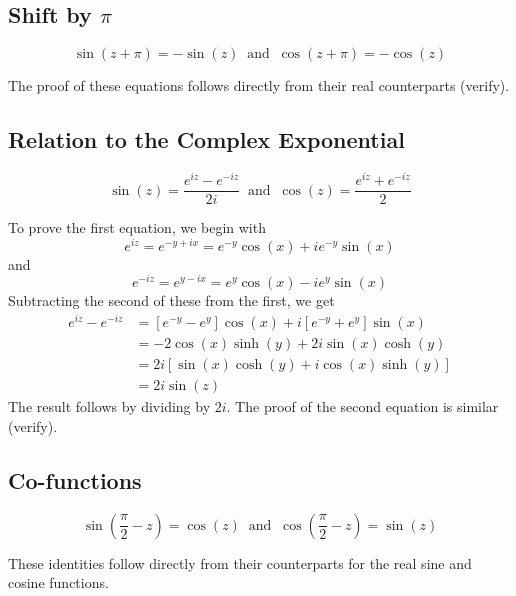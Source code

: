 \documentclass[handout]{ximera}
\begin{document}
\subsection{Shift by $\pi$}
\begin{proposition}
\[
\sin(z + \pi) = -\sin(z) \;\; \mbox{and} \;\; \cos(z+\pi) = -\cos(z)
\]
\end{proposition}
The proof of these equations follows directly from their real counterparts (verify).

\subsection{Relation to the Complex Exponential}
\begin{proposition}
\[
\sin(z) = \frac{e^{iz} - e^{-iz}}{2i} \;\; \mbox{and} \;\;  \cos(z) = \frac{e^{iz} + e^{-iz}}{2}
\]
\end{proposition}
To prove the first equation, we begin with
\[
e^{iz} = e^{-y+ix} = e^{-y}\cos(x) + ie^{-y}\sin(x)
\]
and
\[
e^{-iz} = e^{y-ix} = e^{y}\cos(x) - ie^{y}\sin(x)
\]
Subtracting the second of these from the first, we get
\begin{align*}
e^{iz} - e^{-iz} &= \left[e^{-y}-e^y\right]\cos(x) + i\left[e^{-y}+e^y\right]\sin(x)\\
&=-2\cos(x) \sinh(y) +2i \sin(x)\cosh(y)\\
& = 2i\left[\sin(x)\cosh(y) + i \cos(x)\sinh(y)\right]\\
&=2i\sin(z)
\end{align*}
The result follows by dividing by $2i$.
The proof of the second equation is similar (verify).


\subsection{Co-functions}
\begin{proposition}
\[
\sin\left(\frac{\pi}{2}-z\right) = \cos(z) \;\; \mbox{and} \;\; \cos\left(\frac{\pi}{2}-z\right) = \sin(z)
\]
\end{proposition}
These identities follow directly from their counterparts for the real sine and cosine functions.
\end{document}
